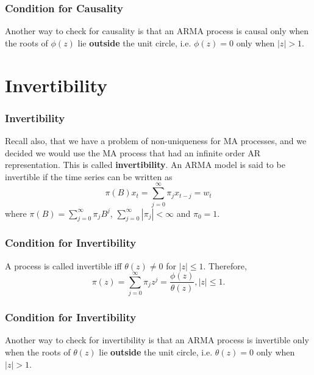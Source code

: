 \documentclass[%
xcolor=pdftex]{beamer}
\begin{document}
\begin{frame}
\frametitle{Condition for Causality}

Another way to check for causality is that an ARMA process is causal only when the roots of $\phi(z)$ lie \textbf{outside} the unit circle, i.e. $\phi(z)=0$ only when $|z| > 1$.

\end{frame}

% 
% 
% 

\section{Invertibility}
\frame{\tableofcontents[currentsection]}

\begin{frame}
\frametitle{Invertibility}

Recall also, that we have a problem of non-uniqueness for MA processes, and we decided we would use the MA process that had an infinite order AR representation.  This is called {\bf invertibility}. An ARMA model is said to be invertible if the time series can be written as
\begin{equation} \label{eq:invert}
\pi(B) x_t = \sum_{j=0}^\infty \pi_j x_{t-j}=w_t
\end{equation}
where $\pi(B) = \sum_{j=0}^\infty \pi_j  B^j $, $ \sum_{j=0}^\infty |\pi_j| < \infty$ and $\pi_0=1$. 


\end{frame}

\begin{frame}
\frametitle{Condition for Invertibility}

A process is called invertible iff $\theta(z) \neq 0$ for $|z|\leq1$.  Therefore,
\begin{equation} \label{eq:invert_rep}
\pi(z)=\sum_{j=0}^\infty \pi_j z^j=\frac{\phi(z)}{\theta(z)},  |z|\leq 1.
\end{equation}

\end{frame}

\begin{frame}
\frametitle{Condition for Invertibility}

Another way to check for invertibility is that an ARMA process is invertible only when the roots of $\theta(z)$ lie \textbf{outside} the unit circle, i.e. $\theta(z)=0$ only when $|z| > 1$.

\end{frame}
\end{document}
